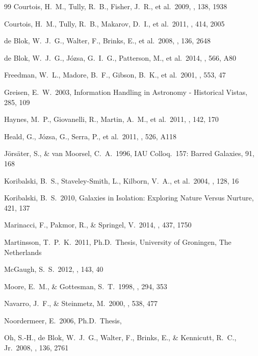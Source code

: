 \documentclass[usenatbib,useAMS]{mnras}
\begin{document}
\begin{thebibliography}{99}
 Courtois, H.~M., Tully, R.~B., Fisher, J.~R., et al.\ 2009, \aj, 138, 1938 

 Courtois, H.~M., Tully, R.~B., Makarov, D.~I., et al.\ 2011, \mnras, 414, 2005 

 de Blok, W.~J.~G., 
Walter, F., Brinks, E., et al.\ 2008, \aj, 136, 2648 

 de Blok, W.~J.~G., J{\'o}zsa, G.~I.~G., Patterson, M., et al.\ 2014, \aap, 566, A80 

 Freedman, W.~L., 
Madore, B.~F., Gibson, B.~K., et al.\ 2001, \apj, 553, 47

 Greisen, E.~W.\ 2003, 
Information Handling in Astronomy - Historical Vistas, 285, 109

 Haynes, M.~P., Giovanelli, R., Martin, A.~M., et al.\ 2011, \aj, 142, 170 

 Heald, G., J{\'o}zsa, G., Serra, P., et al.\ 2011, \aap, 526, A118 

 J\"ors\"ater, S., \& van Moorsel, C.~A.\ 1996, IAU Colloq.~157: Barred Galaxies, 91, 168

 Koribalski, B.~S., Staveley-Smith, L., Kilborn, V.~A., et al.\ 2004, \aj, 128, 16 

 Koribalski, B.~S.\ 2010, 
Galaxies in Isolation: Exploring Nature Versus Nurture, 421, 137

 Marinacci, F., 
Pakmor, R., \& Springel, V.\ 2014, \mnras, 437, 1750 

 Martinsson, T.~P.~K.\ 2011, 
Ph.D.~Thesis, University of Groningen, The Netherlands

 McGaugh, S.~S.\ 2012, \aj, 
143, 40 

 Moore, E.~M., \& Gottesman, S.~T.\ 1998, \mnras, 294, 353 

 Navarro, J.~F., \& Steinmetz, M.\ 2000, \apj, 538, 477

 Noordermeer, E.\ 2006, 
Ph.D.~Thesis,

 Oh, S.-H., de Blok, 
W.~J.~G., Walter, F., Brinks, E., 
\& Kennicutt, R.~C., Jr.\ 2008, \aj, 136, 2761


\end{thebibliography}
\end{document}
